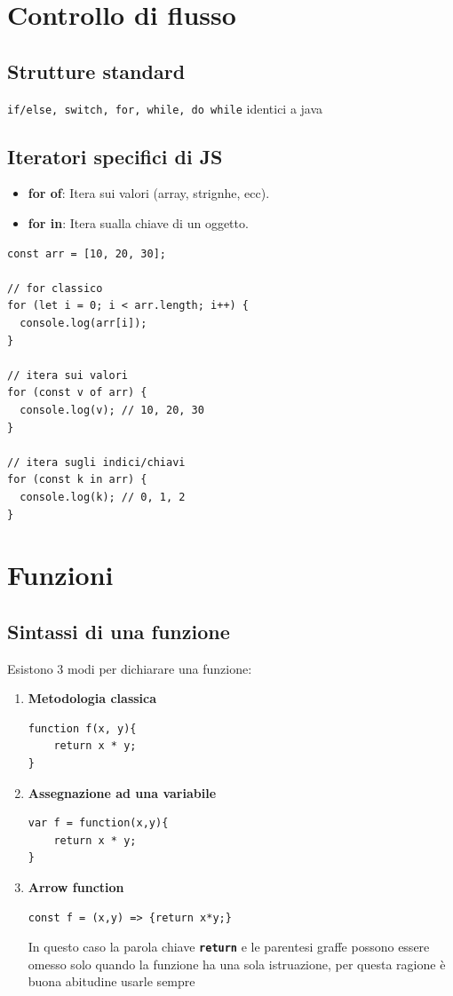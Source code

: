 \section{Controllo di flusso}
\subsection{Strutture standard}
\texttt{if/else, switch, for, while, do while} identici a java
\subsection{Iteratori specifici di JS}
\begin{itemize}
    \item \textbf{for of}: Itera sui valori (array, strignhe, ecc).
    \item \textbf{for in}: Itera sualla chiave di un oggetto.
\end{itemize}


\begin{lstlisting}
const arr = [10, 20, 30];

// for classico
for (let i = 0; i < arr.length; i++) {
  console.log(arr[i]);
}

// itera sui valori
for (const v of arr) {
  console.log(v); // 10, 20, 30
}

// itera sugli indici/chiavi
for (const k in arr) {
  console.log(k); // 0, 1, 2
}
\end{lstlisting}

\newpage

\section{Funzioni}
\subsection{Sintassi di una funzione}
Esistono 3 modi per dichiarare una funzione:
\begin{enumerate}
    \item \textbf{Metodologia classica}
    \begin{lstlisting}
function f(x, y){
    return x * y;
}
    \end{lstlisting}
    \item \textbf{Assegnazione ad una variabile}
    \begin{lstlisting}
var f = function(x,y){
    return x * y;
}
    \end{lstlisting}
    \item \textbf{Arrow function}
    \begin{lstlisting}
const f = (x,y) => {return x*y;}
    \end{lstlisting}

    In questo caso la parola chiave \textbf{\texttt{return}} e le parentesi graffe possono essere omesso solo quando la funzione ha una sola istruazione, per questa ragione è buona abitudine usarle sempre
\end{enumerate}

